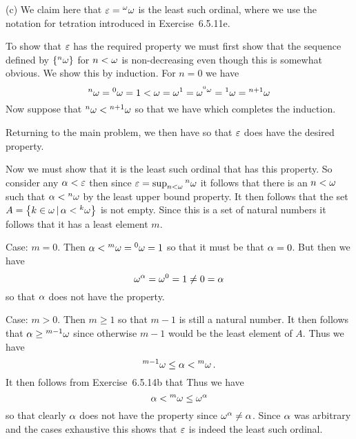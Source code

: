 \begin{solution}
    (c) We claim here that $\varepsilon = {^{\omega}\omega}$ is the least such ordinal, where we use the notation for tetration introduced in Exercise~6.5.11e.

    To show that $\varepsilon$ has the required property we must first show that the sequence defined by $\left\{ {^{n}\omega} \right\}$ for $n < \omega$ is non-decreasing even though this is somewhat obvious.
    We show this by induction.
    For $n=0$ we have
    $$
    {^{n}\omega} = {^{0}\omega} = 1 < \omega = \omega^1 = \omega^{{^{0}\omega}} = {^{1}\omega} = {^{n+1}\omega}
    $$
    Now suppose that ${^{n}\omega} < {^{n+1}\omega}$ so that we have
    which completes the induction.
    
    Returning to the main problem, we then have
    so that $\varepsilon$ does have the desired property.

    Now we must show that it is the least such ordinal that has this property.
    So consider any $\alpha < \varepsilon$ then since $\varepsilon = \sup_{n < \omega} {^{n}\omega}$ it follows that there is an $n < \omega$ such that $\alpha < {^{n}\omega}$ by the least upper bound property.
    It then follows that the set $A = \left\{ k \in \omega \,|\, \alpha < {^{k}\omega} \right\}$ is not empty.
    Since this is a set of natural numbers it follows that it has a least element $m$.

    Case: $m=0$.
    Then $\alpha < {^{m}\omega} = {^{0}\omega} = 1$ so that it must be that $\alpha = 0$.
    But then we have
    $$
    \omega^\alpha = \omega^0 = 1 \neq 0 = \alpha
    $$
    so that $\alpha$ does not have the property.

    Case: $m > 0$.
    Then $m \geq 1$ so that $m-1$ is still a natural number.
    It then follows that $\alpha \geq {^{m-1}\omega}$ since otherwise $m-1$ would be the least element of $A$.
    Thus we have
    $$
    {^{m-1}\omega} \leq \alpha < {^{m}\omega} \,.
    $$
    It then follows from Exercise~6.5.14b that
    Thus we have
    $$
    \alpha < {^{m}\omega} \leq \omega^{\alpha}
    $$
    so that clearly $\alpha$ does not have the property since $\omega^\alpha \neq \alpha$.
    Since $\alpha$ was arbitrary and the cases exhaustive this shows that $\varepsilon$ is indeed the least such ordinal. \qedsymbol
\end{solution}

